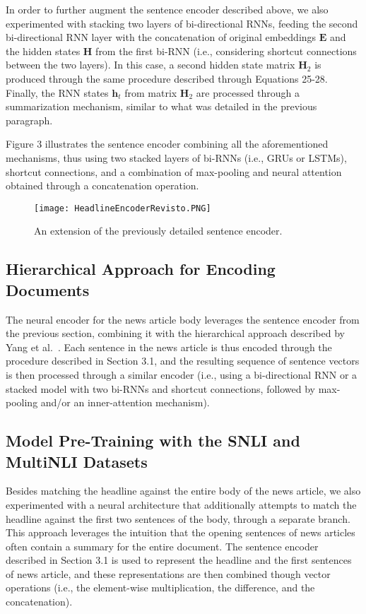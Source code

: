In order to further augment the sentence encoder described above, we also experimented with stacking two layers of bi-directional RNNs, feeding the second bi-directional RNN layer with the concatenation of original embeddings $\boldsymbol{E}$ and the hidden states $\boldsymbol{H}$ from the first bi-RNN (i.e., considering shortcut connections between the two layers). In this case, a second hidden state matrix $\boldsymbol{H}_2$ is produced through the same procedure described through Equations 25-28. Finally, the RNN states $\boldsymbol{h}_{t}$ from matrix $\boldsymbol{H}_2$ are processed through a summarization mechanism, similar to what was detailed in the previous paragraph. 

Figure 3 illustrates the sentence encoder combining all the aforementioned mechanisms, thus using two stacked layers of bi-RNNs (i.e., GRUs or LSTMs), shortcut connections, and a combination of max-pooling and neural attention obtained through a concatenation operation.

\begin{figure}[t!]
  \begin{center}
  \texttt{[image: HeadlineEncoderRevisto.PNG]}
  \caption{An extension of the previously detailed sentence encoder.}
  \label{fig:headencoder}
  \end{center}
\end{figure}

\subsection{Hierarchical Approach for Encoding Documents}

The neural encoder for the news article body leverages the sentence encoder from the previous section, combining it with the hierarchical approach described by Yang et al.~\cite{hierarchical}. Each sentence in the news article is thus encoded through the procedure described in Section 3.1, and the resulting sequence of sentence vectors is then processed through a similar encoder (i.e., using a bi-directional RNN or a stacked model with two bi-RNNs and shortcut connections, followed by max-pooling and/or an inner-attention mechanism).

\subsection{Model Pre-Training with the SNLI and MultiNLI Datasets}

Besides matching the headline against the entire body of the news article, we also experimented with a neural architecture that additionally attempts to match the headline against the first two sentences of the body, through a separate branch. This approach leverages the intuition that the opening sentences of news articles often contain a summary for the entire document. The sentence encoder described in Section 3.1 is used to represent the headline and the first sentences of news article, and these representations are then combined though vector operations (i.e., the element-wise multiplication, the difference, and the concatenation).

